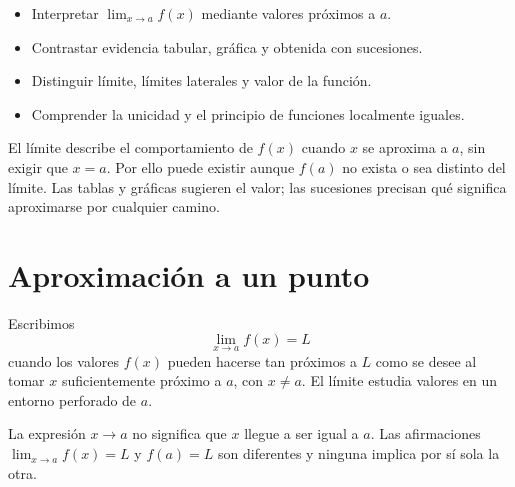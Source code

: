 \ifdefined\documentoSemanal
\else
\usepackage{tikz}
\usepackage{estilo_apuntes}
\usetikzlibrary{babel}

\fi

\ifdefined\documentoSemanal
\else
{}

\begin{objetivos}
\begin{itemize}
  \item Interpretar $\lim_{x\to a}f(x)$ mediante valores próximos a $a$.
  \item Contrastar evidencia tabular, gráfica y obtenida con sucesiones.
  \item Distinguir límite, límites laterales y valor de la función.
  \item Comprender la unicidad y el principio de funciones localmente iguales.
\end{itemize}
\end{objetivos}

\begin{resumen}
El límite describe el comportamiento de $f(x)$ cuando $x$ se aproxima a $a$, sin exigir que $x=a$. Por ello puede existir aunque $f(a)$ no exista o sea distinto del límite. Las tablas y gráficas sugieren el valor; las sucesiones precisan qué significa aproximarse por cualquier camino.
\end{resumen}
\fi

\section*{Aproximación a un punto}

\begin{definicion}
Escribimos
\[
\lim_{x\to a}f(x)=L
\]
cuando los valores $f(x)$ pueden hacerse tan próximos a $L$ como se desee al tomar $x$ suficientemente próximo a $a$, con $x\neq a$. El límite estudia valores en un entorno perforado de $a$.
\end{definicion}

\begin{nota}
La expresión $x\to a$ no significa que $x$ llegue a ser igual a $a$. Las afirmaciones $\lim_{x\to a}f(x)=L$ y $f(a)=L$ son diferentes y ninguna implica por sí sola la otra.
\end{nota}

